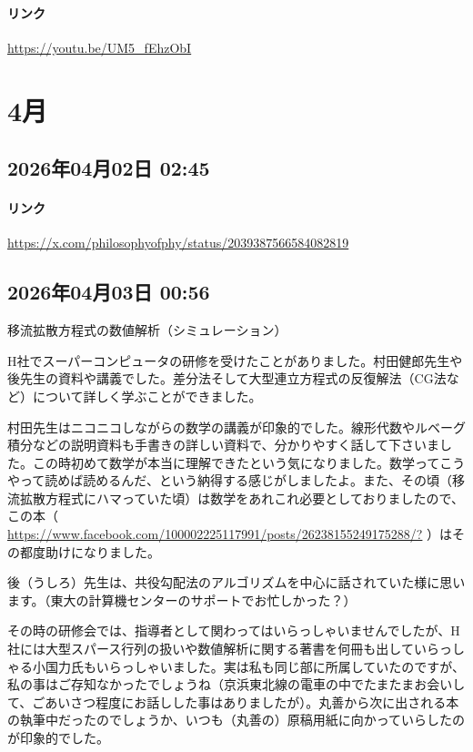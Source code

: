 \paragraph{リンク}
\url{https://youtu.be/UM5_fEhzObI}

\section{4月}

\subsection*{2026年04月02日 02:45}

\paragraph{リンク}
\url{https://x.com/philosophyofphy/status/2039387566584082819}

\subsection*{2026年04月03日 00:56}

移流拡散方程式の数値解析（シミュレーション）

H社でスーパーコンピュータの研修を受けたことがありました。村田健郎先生や後先生の資料や講義でした。差分法そして大型連立方程式の反復解法（CG法など）について詳しく学ぶことができました。

村田先生はニコニコしながらの数学の講義が印象的でした。線形代数やルベーグ積分などの説明資料も手書きの詳しい資料で、分かりやすく話して下さいました。この時初めて数学が本当に理解できたという気になりました。数学ってこうやって読めば読めるんだ、という納得する感じがしましたよ。また、その頃（移流拡散方程式にハマっていた頃）は数学をあれこれ必要としておりましたので、この本（ \url{https://www.facebook.com/100002225117991/posts/26238155249175288/?} ）はその都度助けになりました。

後（うしろ）先生は、共役勾配法のアルゴリズムを中心に話されていた様に思います。（東大の計算機センターのサポートでお忙しかった？）

その時の研修会では、指導者として関わってはいらっしゃいませんでしたが、H社には大型スパース行列の扱いや数値解析に関する著書を何冊も出していらっしゃる小国力氏もいらっしゃいました。実は私も同じ部に所属していたのですが、私の事はご存知なかったでしょうね（京浜東北線の電車の中でたまたまお会いして、ごあいさつ程度にお話しした事はありましたが）。丸善から次に出される本の執筆中だったのでしょうか、いつも（丸善の）原稿用紙に向かっていらしたのが印象的でした。

